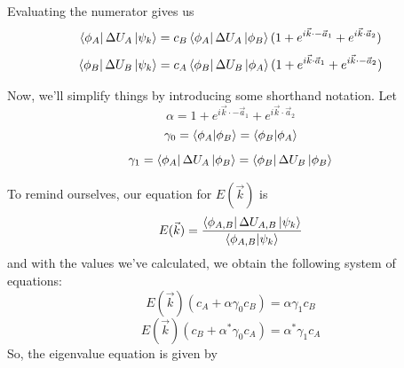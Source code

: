 \documentclass{article}
\begin{document}
Evaluating the numerator gives us
$$\bra{\phi_{A}}\Delta U_{A}\ket{\psi_{k}} = c_{B}\bra{\phi_{A}}\Delta U_{A}\ket{\phi_{B}}(1 + e^{i\vec{k}\cdot-\vec{a}_{1}} + e^{i\vec{k}\cdot\vec{a}_{2}})$$
$$\bra{\phi_{B}}\Delta U_{B}\ket{\psi_{k}} = c_{A}\bra{\phi_{B}}\Delta U_{B}\ket{\phi_{A}}(1 + e^{i\vec{k}\cdot\vec{a}_{1}} + e^{i\vec{k}\cdot-\vec{a}_{2}})$$

Now, we'll simplify things by introducing some shorthand notation. Let
$$ \alpha =  1 + e^{i\vec{k}\cdot-\vec{a}_{1}} + e^{i\vec{k}\cdot\vec{a}_{2}}$$
$$ \gamma_{0} = \bra{\phi_{A}}\ket{\phi_{B}} = \bra{\phi_{B}}\ket{\phi_{A}}$$
$$ \gamma_{1} = \bra{\phi_{A}}\Delta U_{A}\ket{\phi_{B}} = \bra{\phi_{B}}\Delta U_{B}\ket{\phi_{B}}$$

To remind ourselves, our equation for $E(\vec{k})$ is
$$E(\vec{k}) = \frac{\bra{\phi_{A,B}}\Delta U_{A,B}\ket{\psi_{k}}}{\bra{\phi_{A,B}}\ket{\psi_{k}}}$$
and with the values we've calculated, we obtain the following system of equations:
$$E(\vec{k})(c_{A} + \alpha\gamma_{0}c_{B}) = \alpha\gamma_{1}c_{B}$$
$$E(\vec{k})(c_{B} + \alpha^{*}\gamma_{0}c_{A}) = \alpha^{*}\gamma_{1}c_{A}$$
So, the eigenvalue equation is given by
\end{document}
